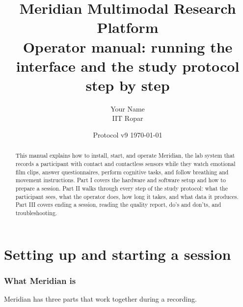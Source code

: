 \documentclass[11pt,a4paper]{article}
\title{\color{ink}\textbf{Meridian Multimodal Research Platform}\\[6pt]
  \Large Operator manual: running the interface and the study protocol step by step}
\author{Your Name \\ IIT Ropar}
\date{Protocol v9 \quad\textbar\quad \today}
\begin{document}
\maketitle
\thispagestyle{empty}

\begin{abstract}
This manual explains how to install, start, and operate Meridian, the lab system that records a participant
with contact and contactless sensors while they watch emotional film clips, answer questionnaires, perform
cognitive tasks, and follow breathing and movement instructions. Part I covers the hardware and software setup
and how to prepare a session. Part II walks through every step of the study protocol: what the participant
sees, what the operator does, how long it takes, and what data it produces. Part III covers ending a session,
reading the quality report, do's and don'ts, and troubleshooting.
\end{abstract}

\tableofcontents
\newpage

\part{Setting up and starting a session}

\section{What Meridian is}

Meridian has three parts that work together during a recording.
\end{document}
